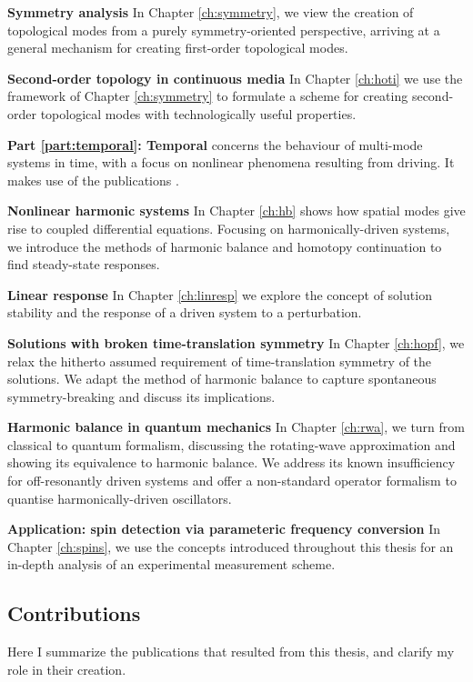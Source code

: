 \textbf{Symmetry analysis} In Chapter \ref{ch:symmetry}, we view the creation of topological modes from a purely symmetry-oriented perspective, arriving at a general mechanism for creating first-order topological modes. 

\textbf{Second-order topology in continuous media} In Chapter \ref{ch:hoti} we use the framework of Chapter \ref{ch:symmetry} to formulate a scheme for creating second-order topological modes with technologically useful properties.

\textbf{Part \ref{part:temporal}: Temporal} concerns the behaviour of multi-mode systems in time, with a focus on nonlinear phenomena resulting from driving. It makes use of the publications \cite{Kosata_2022a, Kosata_2022b, Kosata_2020}.

\textbf{Nonlinear harmonic systems} In Chapter \ref{ch:hb} shows how spatial modes give rise to coupled differential equations. Focusing on harmonically-driven systems, we introduce the methods of harmonic balance and homotopy continuation to find steady-state responses.

\textbf{Linear response} In Chapter \ref{ch:linresp} we explore the concept of solution stability and the response of a driven system to a perturbation. 

\textbf{Solutions with broken time-translation symmetry} In Chapter \ref{ch:hopf}, we relax the hitherto assumed requirement of time-translation symmetry of the solutions. We adapt the method of harmonic balance to capture spontaneous symmetry-breaking and discuss its implications. 

\textbf{Harmonic balance in quantum mechanics} In Chapter \ref{ch:rwa}, we turn from classical to quantum formalism, discussing the rotating-wave approximation and showing its equivalence to harmonic balance. We address its known insufficiency for off-resonantly driven systems and offer a non-standard operator formalism to quantise harmonically-driven oscillators. 

\textbf{Application: spin detection via parameteric frequency conversion} In Chapter \ref{ch:spins}, we use the concepts introduced throughout this thesis for an in-depth analysis of an experimental measurement scheme. 
%

\subsection*{Contributions}
Here I summarize the publications that resulted from this thesis, and clarify my role in their creation.

